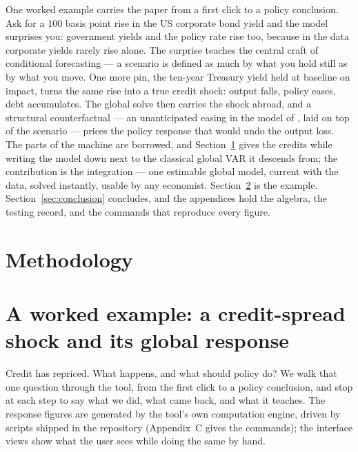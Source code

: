 \documentclass[11pt]{article}
\begin{document}
One worked example carries the paper from a first click to a policy conclusion. Ask for a 100
basis point rise in the US corporate bond yield and the model surprises you: government yields
and the policy rate rise too, because in the data corporate yields rarely rise alone. The
surprise teaches the central craft of conditional forecasting --- a scenario is defined as
much by what you hold still as by what you move. One more pin, the ten-year Treasury yield
held at baseline on impact, turns the same rise into a true credit shock: output falls, policy
eases, debt accumulates. The global solve then carries the shock abroad, and a structural
counterfactual --- an unanticipated easing in the model of \citet{SmetsWouters2007}, laid on
top of the scenario --- prices the policy response that would undo the output loss. The parts
of the machine are borrowed, and Section~\ref{sec:method} gives the credits while writing the
model down next to the classical global VAR it descends from; the contribution is the
integration --- one estimable global model, current with the data, solved instantly, usable by
any economist. Section~\ref{sec:example} is the example. Section~\ref{sec:conclusion}
concludes, and the appendices hold the algebra, the testing record, and the commands that
reproduce every figure.

\section{Methodology}\label{sec:method}



\section{A worked example: a credit-spread shock and its global response}\label{sec:example}

Credit has repriced. What happens, and what should policy do? We walk that one question
through the tool, from the first click to a policy conclusion, and stop at each step to say
what we did, what came back, and what it teaches. The response figures are generated by the
tool's own computation engine, driven by scripts shipped in the repository (Appendix~C gives
the commands); the interface views show what the user sees while doing the same by hand.
\end{document}
